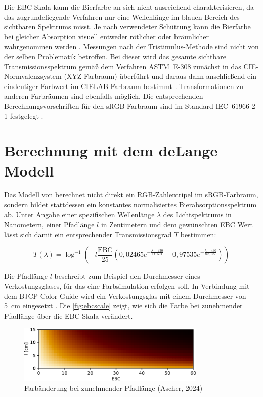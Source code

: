 \documentclass[10pt,a4paper,DIV=12,parskip=half]{scrarticle}
\begin{document}
Die EBC Skala kann die Bierfarbe an sich nicht ausreichend charakterisieren, da das zugrundeliegende Verfahren nur eine Wellenlänge im blauen Bereich des sichtbaren Spektrums misst. Je nach verwendeter Schüttung kann die Bierfarbe bei gleicher Absorption visuell entweder rötlicher oder bräunlicher wahrgenommen werden \parencite{Tucker2017}. Messungen nach der Tristimulus-Methode sind nicht von der selben Problematik betroffen. Bei dieser wird das gesamte sichtbare Transmissionsspektrum gemäß dem Verfahren ASTM~E-308 zunächst in das CIE-Normvalenzsystem (XYZ-Farbraum) überführt und daraus dann anschließend ein eindeutiger Farbwert im CIELAB-Farbraum bestimmt \parencites{deLange2016}{ASBC2011}. Transformationen zu anderen Farbräumen sind ebenfalls möglich. Die entsprechenden Berechnungsvorschriften für den sRGB-Farbraum sind im Standard IEC~61966-2-1 festgelegt \parencite{W3C2015}.

\section*{Berechnung mit dem deLange Modell}

Das Modell von \cite{deLange2016} berechnet nicht direkt ein RGB-Zahlentripel im sRGB-Farbraum, sondern bildet stattdessen ein konstantes normalisiertes Bierabsorptionsspektrum ab. Unter Angabe einer spezifischen Wellenlänge $\lambda$ des Lichtspektrums in Nanometern, einer Pfadlänge $l$ in Zentimetern und dem gewünschten EBC Wert lässt sich damit ein entsprechender Transmissionsgrad $T$ bestimmen:

\begin{equation*}
T(\lambda)=\log^{-1}\left(-l \frac{\text{EBC}}{25} \left(0,02465e^{-\frac{\lambda-430}{17,591}}+0,97535e^{-\frac{\lambda-430}{82,122}}\right)\right)
\end{equation*}

Die Pfadlänge $l$ beschreibt zum Beispiel den Durchmesser eines Verkostungsglases, für das eine Farbsimulation erfolgen soll. In Verbindung mit dem BJCP Color Guide wird ein Verkostungsglas mit einem Durchmesser von 5~cm eingesetzt \parencite{BJCP}. Die \autoref{fig:ebcscale} zeigt, wie sich die Farbe bei zunehmender Pfadlänge über die EBC Skala verändert.

\begin{figure}[H]
	\centering
	\includegraphics[width=9cm]{ebc_scale.pdf}
	\caption{Farbänderung bei zunehmender Pfadlänge (Ascher, 2024)}
	\label{fig:ebcscale}
\end{figure}
\end{document}
